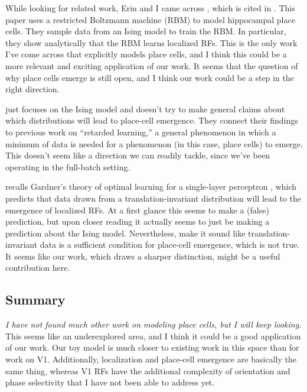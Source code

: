 While looking for related work, Erin and I came across \cite{harsh2020place}, which is cited in \cite{ingrosso2022data}.
This paper uses a restricted Boltzmann machine (RBM) to model hippocampal place cells.
They sample data from an Ising model to train the RBM.
In particular, they show analytically that the RBM learns localized RFs.
This is the only work I've come across that explicitly models place cells, and I think this could be a more relevant and exciting application of our work.
It seems that the question of why place cells emerge is still open, and I think our work could be a step in the right direction.

\cite{harsh2020place} just focuses on the Ising model and doesn't try to make general claims about which distributions will lead to place-cell emergence.
They connect their findings to previous work on ``retarded learning,'' a general phenomenon in which a minimum of data is needed for a phenomenon (in this case, place cells) to emerge.
This doesn't seem like a direction we can readily tackle, since we've been operating in the full-batch setting.

\cite{harsh2020place} recalls Gardner's theory of optimal learning for a single-layer perceptron \cite{gardner1988space}, which predicts that data drawn from a translation-invariant distribution will lead to the emergence of localized RFs.
At a first glance this seems to make a (false) prediction, but upon closer reading it actually seems to just be making a prediction about the Ising model.
Nevertheless, \cite{harsh2020place} make it sound like translation-invariant data is a sufficient condition for place-cell emergence, which is not true.
It seems like our work, which draws a sharper distinction, might be a useful contribution here.

\subsection*{Summary}
\emph{I have not found much other work on modeling place cells, but I will keep looking.}
This seems like an underexplored area, and I think it could be a good application of our work.
Our toy model is much closer to existing work in this space than for work on V1.
Additionally, localization and place-cell emergence are basically the same thing, whereas V1 RFs have the additional complexity of orientation and phase selectivity that I have not been able to address yet.
